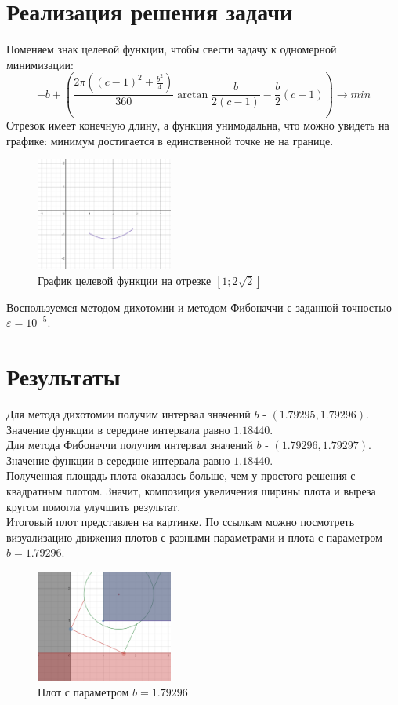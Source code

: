 \section{Реализация решения задачи}
Поменяем знак целевой функции, чтобы свести задачу к одномерной минимизации:
\begin{equation}
-b+(\frac{2\pi ((c-1)^2+\frac{b^2}{4})}{360} \arctan{\frac{b}{2(c-1)}} - \frac{b}{2}(c-1)) \rightarrow min
\end{equation}
Отрезок имеет конечную длину, а функция унимодальна, что можно увидеть на графике: минимум достигается в единственной точке не на границе.\\

\begin{figure}[!htb]
    \centering
    \includegraphics[width=0.4\textwidth]{fig/function.png}
    \caption{График целевой функции на отрезке $[1;2\sqrt{2}]$}
\end{figure}

Воспользуемся методом дихотомии и методом Фибоначчи с заданной точностью $\varepsilon=10^{-5}$.


\section{Результаты}
Для метода дихотомии получим интервал значений $b$ - $(1.79295, 1.79296)$. Значение функции в середине интервала равно $1.18440$. \\

Для метода Фибоначчи получим интервал значений $b$ - $(1.79296, 1.79297)$. Значение функции в середине интервала равно $1.18440$. \\

Полученная площадь плота оказалась больше, чем у простого решения с квадратным плотом. Значит, композиция увеличения ширины плота и выреза кругом помогла улучшить результат. \\

Итоговый плот представлен на картинке. По ссылкам можно посмотреть визуализацию движения плотов с разными параметрами и плота с параметром $b=1.79296$.
\begin{figure}[!htb]
    \centering
    \includegraphics[width=0.4\textwidth]{fig/solution.png}
    \caption{Плот с параметром $b=1.79296$}
\end{figure}


